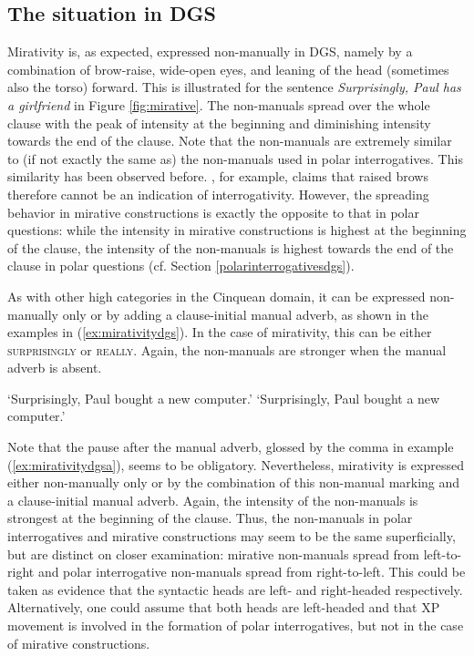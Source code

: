 \subsection{The situation in DGS}
Mirativity is, as expected, expressed non-manually in DGS, namely by a combination of brow-raise, wide-open eyes, and leaning of the head (sometimes also the torso) forward. This is illustrated for the sentence \textit{Surprisingly, Paul has a girlfriend} in Figure \ref{fig:mirative}. The non-manuals spread over the whole clause with the peak of intensity at the beginning and diminishing intensity towards the end of the clause. Note that the non-manuals are extremely similar to (if not exactly the same as) the non-manuals used in polar interrogatives. This similarity has been observed before. \citet[134]{herrmann2013modal}, for example, claims that raised brows therefore cannot be an indication of interrogativity. However, the spreading behavior in mirative constructions is exactly the opposite to that in polar questions: while the intensity in mirative constructions is highest at the beginning of the clause, the intensity of the non-manuals is highest towards the end of the clause in polar questions (cf. Section \ref{polarinterrogativesdgs}). 

As with other high categories in the Cinquean domain, it can be expressed non-manually only or by adding a clause-initial manual adverb, as shown in the examples in (\ref{ex:mirativitydgs}). In the case of mirativity, this can be either \textsc{surprisingly} or \textsc{really}. Again, the non-manuals are stronger when the manual adverb is absent. %


\begin{exe}
\ex\label{ex:mirativitydgs}\begin{xlist}
\ex {}
\glt `Surprisingly, Paul bought a new computer.'\label{ex:mirativitydgsa}
\ex {}
\glt `Surprisingly, Paul bought a new computer.'
\end{xlist}
\end{exe}

\noindent Note that the pause after the manual adverb, glossed by the comma in example (\ref{ex:mirativitydgsa}), seems to be obligatory. Nevertheless, mirativity is expressed either non-manually only or by the combination of this non-manual marking and a clause-initial manual adverb. Again, the intensity of the non-manuals is strongest at the beginning of the clause. Thus, the non-manuals in polar interrogatives and mirative constructions may seem to be the same superficially, but are distinct on closer examination: mirative non-manuals spread from left-to-right and polar interrogative non-manuals spread from right-to-left. This could be taken as evidence that the syntactic heads are left- and right-headed respectively. Alternatively, one could assume that both heads are left-headed and that XP movement is involved in the formation of polar interrogatives, but not in the case of mirative constructions.

